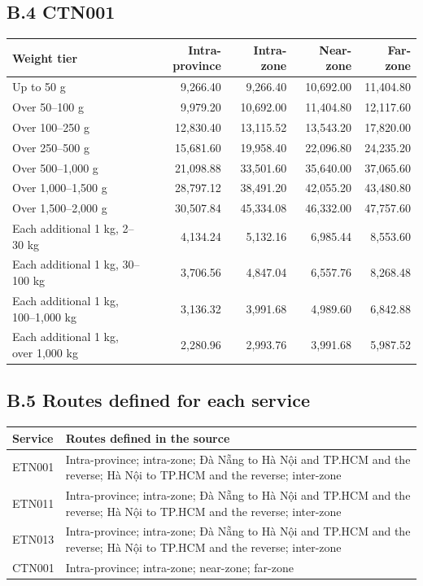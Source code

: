 \subsection*{B.4 CTN001}

\begin{table}[H]
\centering
\small
\setlength{\tabcolsep}{5pt}
\begin{tabular}{lrrrr}
\hline
\textbf{Weight tier} & \textbf{Intra-province} & \textbf{Intra-zone} & \textbf{Near-zone} & \textbf{Far-zone} \\
\hline
Up to 50 g & 9,266.40 & 9,266.40 & 10,692.00 & 11,404.80 \\
Over 50--100 g & 9,979.20 & 10,692.00 & 11,404.80 & 12,117.60 \\
Over 100--250 g & 12,830.40 & 13,115.52 & 13,543.20 & 17,820.00 \\
Over 250--500 g & 15,681.60 & 19,958.40 & 22,096.80 & 24,235.20 \\
Over 500--1,000 g & 21,098.88 & 33,501.60 & 35,640.00 & 37,065.60 \\
Over 1,000--1,500 g & 28,797.12 & 38,491.20 & 42,055.20 & 43,480.80 \\
Over 1,500--2,000 g & 30,507.84 & 45,334.08 & 46,332.00 & 47,757.60 \\
Each additional 1 kg, 2--30 kg & 4,134.24 & 5,132.16 & 6,985.44 & 8,553.60 \\
Each additional 1 kg, 30--100 kg & 3,706.56 & 4,847.04 & 6,557.76 & 8,268.48 \\
Each additional 1 kg, 100--1,000 kg & 3,136.32 & 3,991.68 & 4,989.60 & 6,842.88 \\
Each additional 1 kg, over 1,000 kg & 2,280.96 & 2,993.76 & 3,991.68 & 5,987.52 \\
\hline
\end{tabular}
\end{table}

\subsection*{B.5 Routes defined for each service}

\begin{table}[H]
\centering
\small
\begin{tabular}{lp{9.4cm}}
\hline
\textbf{Service} & \textbf{Routes defined in the source} \\
\hline
ETN001 & Intra-province; intra-zone; Đà Nẵng to Hà Nội and TP.HCM and the reverse; Hà Nội to TP.HCM and the reverse; inter-zone \\
ETN011 & Intra-province; intra-zone; Đà Nẵng to Hà Nội and TP.HCM and the reverse; Hà Nội to TP.HCM and the reverse; inter-zone \\
ETN013 & Intra-province; intra-zone; Đà Nẵng to Hà Nội and TP.HCM and the reverse; Hà Nội to TP.HCM and the reverse; inter-zone \\
CTN001 & Intra-province; intra-zone; near-zone; far-zone \\
\hline
\end{tabular}
\end{table}

